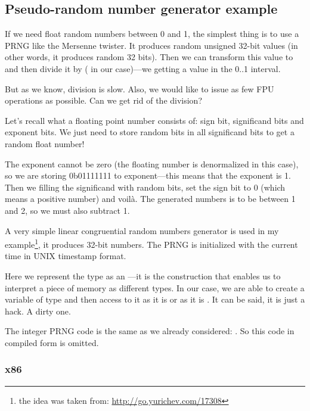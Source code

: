 \subsection{Pseudo-random number generator example}
\label{FPU_PRNG}

If we need float random numbers between 0 and 1, the simplest thing is to use a \ac{PRNG} like
the Mersenne twister. 
It produces random unsigned 32-bit values (in other words, it produces random 32 bits).
Then we can transform this value to \Tfloat and then
divide it by  ( in our case)---we getting a value in the 0..1 interval.

But as we know, division is slow.
Also, we would like to issue as few FPU operations as possible.
Can we get rid of the division?


Let's recall what a floating point number consists of: sign bit, significand bits and exponent bits.
We just need to store random bits in all significand bits to get a random float number!

The exponent cannot be zero (the floating number is denormalized in this case),
so we are storing 0b01111111
to exponent---this means that the exponent is 1. 
Then we filling the significand with random bits, set the sign bit to
0 (which means a positive number) and voilà.
The generated numbers is to be between 1 and 2, so we must also subtract 1.

\newcommand{\URLXOR}{\url{http://go.yurichev.com/17308}}

A very simple linear congruential random numbers generator is used in my 
example\footnote{the idea was taken from: \URLXOR}, it produces 32-bit numbers. 
The \ac{PRNG} is initialized with the current time in UNIX timestamp format.

Here we represent the \Tfloat type as an ---it is the \CCpp construction that enables us
to interpret a piece of memory as different types.
In our case, we are able to create a variable
of type  and then access to it as it is \Tfloat or as it is . 
It can be said, it is just a hack. A dirty one.


The integer \ac{PRNG} code is the same as we already considered: .
So this code in compiled form is omitted.



\subsubsection{x86}

